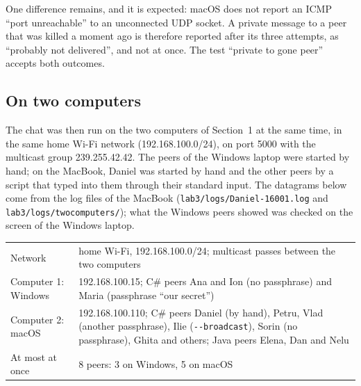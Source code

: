 \documentclass[11pt,a4paper]{article}
\newcommand{\code}[1]{{\frenchspacing\texttt{#1}}}
\begin{document}
One difference remains, and it is expected: macOS does not report an ICMP ``port unreachable'' to
an unconnected UDP socket. A private message to a peer that was killed a moment ago is therefore
reported after its three attempts, as ``probably not delivered'', and not at once. The test
``private to gone peer'' accepts both outcomes.

\subsection{On two computers}\label{sec:two}

The chat was then run on the two computers of Section~1 at the same time, in the same home Wi-Fi
network (192.168.100.0/24), on port 5000 with the multicast group 239.255.42.42. The peers of the
Windows laptop were started by hand; on the MacBook, Daniel was started by hand and the other peers
by a script that typed into them through their standard input. The datagrams below come from the log
files of the MacBook (\code{lab3/logs/Daniel-16001.log} and \code{lab3/logs/twocomputers/}); what
the Windows peers showed was checked on the screen of the Windows laptop.

\begin{center}
\small
\begin{tabularx}{\linewidth}{@{}p{3.6cm}X@{}}
\toprule
Network & home Wi-Fi, 192.168.100.0/24; multicast passes between the two computers \\
Computer 1: Windows & 192.168.100.15; C\# peers Ana and Ion (no passphrase) and Maria
  (passphrase ``our secret'') \\
Computer 2: macOS & 192.168.100.110; C\# peers Daniel (by hand), Petru, Vlad (another
  passphrase), Ilie (\code{-{}-broadcast}), Sorin (no passphrase), Ghita and others; Java peers
  Elena, Dan and Nelu \\
At most at once & 8 peers: 3 on Windows, 5 on macOS \\
\bottomrule
\end{tabularx}
\end{center}
\end{document}
